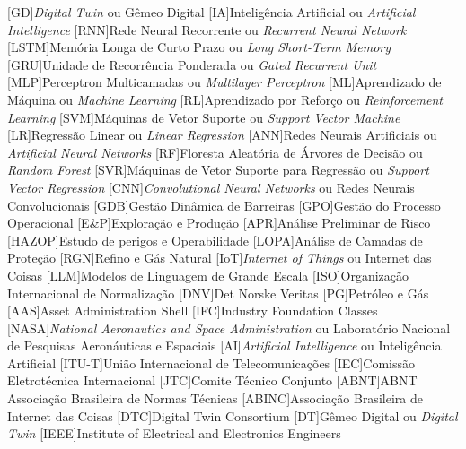 \begin{acronym}
    [GD]{\textit{Digital Twin} ou Gêmeo Digital}
    [IA]{Inteligência Artificial ou \textit{Artificial Intelligence}}
    [RNN]{Rede Neural Recorrente ou \textit{Recurrent Neural Network}}
    [LSTM]{Memória Longa de Curto Prazo ou \textit{Long Short-Term Memory}}
    [GRU]{Unidade de Recorrência Ponderada ou \textit{Gated Recurrent Unit}}
    [MLP]{Perceptron Multicamadas ou \textit{Multilayer Perceptron}}
    [ML]{Aprendizado de Máquina ou \textit{Machine Learning}}
    [RL]{Aprendizado por Reforço ou \textit{Reinforcement Learning}}
    [SVM]{Máquinas de Vetor Suporte ou \textit{Support Vector Machine}}
    [LR]{Regressão Linear ou \textit{Linear Regression}}
    [ANN]{Redes Neurais Artificiais ou \textit{Artificial Neural Networks}}
    [RF]{Floresta Aleatória de Árvores de Decisão ou \textit{Random Forest}}
    [SVR]{Máquinas de Vetor Suporte para Regressão ou \textit{Support Vector Regression}}
    [CNN]{\textit{Convolutional Neural Networks} ou Redes Neurais Convolucionais}
    [GDB]{Gestão Dinâmica de Barreiras}
    [GPO]{Gestão do Processo Operacional}
    [E\&P]{Exploração e Produção}
    [APR]{Análise Preliminar de Risco}
    [HAZOP]{Estudo de perigos e Operabilidade}
    [LOPA]{Análise de Camadas de Proteção}
    [RGN]{Refino e Gás Natural}
    [IoT]{\textit{Internet of Things} ou Internet das Coisas}
    [LLM]{Modelos de Linguagem de Grande Escala}
    [ISO]{Organização Internacional de Normalização}
    [DNV]{Det Norske Veritas}
    [PG]{Petróleo e Gás}
    [AAS]{Asset Administration Shell}
    [IFC]{Industry Foundation Classes}
    [NASA]{\textit{National Aeronautics and Space Administration} ou Laboratório Nacional de Pesquisas Aeronáuticas e Espaciais}
    [AI]{\textit{Artificial Intelligence} ou Inteligência Artificial}
    [ITU-T]{União Internacional de Telecomunicações}
    [IEC]{Comissão Eletrotécnica Internacional}
    [JTC]{Comite Técnico Conjunto}
    [ABNT]{ABNT Associação Brasileira de Normas Técnicas}
    [ABINC]{Associação Brasileira de Internet das Coisas}
    [DTC]{Digital Twin Consortium }
    [DT]{Gêmeo Digital ou \textit{Digital Twin}}
    [IEEE]{Institute of Electrical and Electronics Engineers}

\end{acronym}
